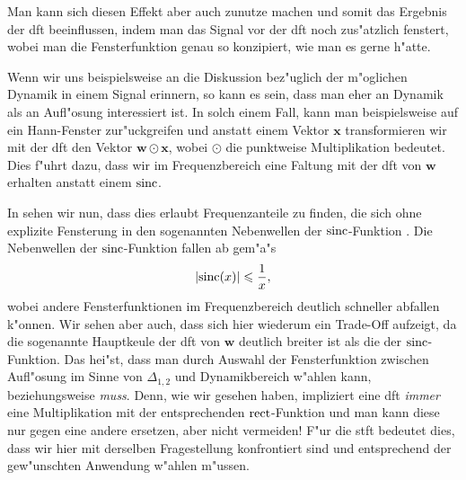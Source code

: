 %
%
\clearpage
Man kann sich diesen Effekt aber auch zunutze machen und somit das Ergebnis der \gls{dft} beeinflussen, indem man das Signal vor der \gls{dft} noch zus"atzlich fenstert, wobei man die Fensterfunktion genau so konzipiert, wie man es gerne h"atte.

Wenn wir uns beispielsweise an die Diskussion bez"uglich der m"oglichen Dynamik in einem Signal erinnern, so kann es sein, dass man eher an Dynamik als an Aufl"osung interessiert ist.
In solch einem Fall, kann man beispielsweise auf ein Hann-Fenster zur"uckgreifen und anstatt einem Vektor $\bm x$ transformieren wir mit der \gls{dft} den Vektor $\bm w \odot \bm x$, wobei $\odot$ die punktweise Multiplikation bedeutet.
Dies f"uhrt dazu, dass wir im Frequenzbereich eine Faltung mit der \gls{dft} von $\bm w$ erhalten anstatt einem $\operatorname*{sinc}$.

In  sehen wir nun, dass dies erlaubt Frequenzanteile zu finden, die sich ohne explizite Fensterung in den sogenannten Nebenwellen der $\operatorname*{sinc}$-Funktion .
Die Nebenwellen der $\operatorname*{sinc}$-Funktion fallen ab gem"a"s
\[
{\left| \operatorname*{sinc}(x) \right|} \leqslant \frac{1}{x},
\]
wobei andere Fensterfunktionen im Frequenzbereich deutlich schneller abfallen k"onnen.
Wir sehen aber auch, dass sich hier wiederum ein Trade-Off aufzeigt, da die sogenannte Hauptkeule der \gls{dft} von $\bm w$ deutlich breiter ist als die der $\operatorname*{sinc}$-Funktion.
Das hei"st, dass man durch Auswahl der Fensterfunktion zwischen Aufl"osung im Sinne von $\Delta_{1,2}$ und Dynamikbereich w"ahlen kann, beziehungsweise \emph{muss}.
Denn, wie wir gesehen haben, impliziert eine \gls{dft} \emph{immer} eine Multiplikation mit der entsprechenden $\operatorname*{rect}$-Funktion und man kann diese nur gegen eine andere ersetzen, aber nicht vermeiden!
F"ur die \gls{stft} bedeutet dies, dass wir hier  mit derselben Fragestellung konfrontiert sind und entsprechend der gew"unschten Anwendung w"ahlen m"ussen.


